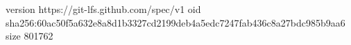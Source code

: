 version https://git-lfs.github.com/spec/v1
oid sha256:60ac50f5a632e8a8d1b3327cd2199deb4a5edc7247fab436c8a27bdc985b9aa6
size 801762
